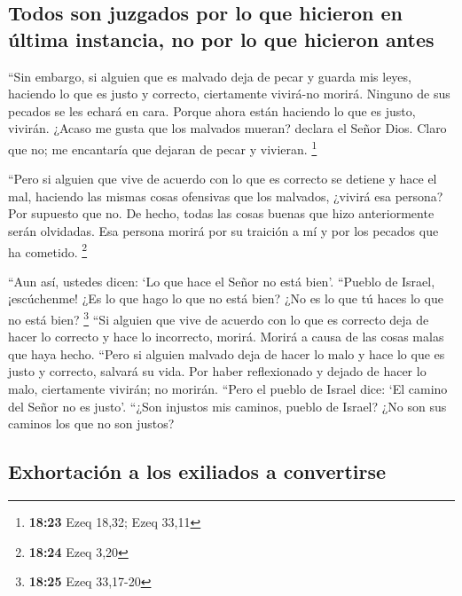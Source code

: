 \hypertarget{todos-son-juzgados-por-lo-que-hicieron-en-uxfaltima-instancia-no-por-lo-que-hicieron-antes}{%
\subsection{Todos son juzgados por lo que hicieron en última instancia,
no por lo que hicieron
antes}\label{todos-son-juzgados-por-lo-que-hicieron-en-uxfaltima-instancia-no-por-lo-que-hicieron-antes}}

 ``Sin embargo, si alguien que es malvado deja de pecar y
guarda mis leyes, haciendo lo que es justo y correcto, ciertamente
vivirá-no morirá.  Ninguno de sus pecados se les echará
en cara. Porque ahora están haciendo lo que es justo, vivirán.
 ¿Acaso me gusta que los malvados mueran? declara el
Señor Dios. Claro que no; me encantaría que dejaran de pecar y vivieran.
\footnote{\textbf{18:23} Ezeq 18,32; Ezeq 33,11}

 ``Pero si alguien que vive de acuerdo con lo que es
correcto se detiene y hace el mal, haciendo las mismas cosas ofensivas
que los malvados, ¿vivirá esa persona? Por supuesto que no. De hecho,
todas las cosas buenas que hizo anteriormente serán olvidadas. Esa
persona morirá por su traición a mí y por los pecados que ha cometido.
\footnote{\textbf{18:24} Ezeq 3,20}

 ``Aun así, ustedes dicen: `Lo que hace el Señor no está
bien'. ``Pueblo de Israel, ¡escúchenme! ¿Es lo que hago lo que no está
bien? ¿No es lo que tú haces lo que no está bien? \footnote{\textbf{18:25}
  Ezeq 33,17-20}  ``Si alguien que vive de acuerdo con lo
que es correcto deja de hacer lo correcto y hace lo incorrecto, morirá.
Morirá a causa de las cosas malas que haya hecho.  ``Pero
si alguien malvado deja de hacer lo malo y hace lo que es justo y
correcto, salvará su vida.  Por haber reflexionado y
dejado de hacer lo malo, ciertamente vivirán; no morirán.
 ``Pero el pueblo de Israel dice: `El camino del Señor no
es justo'. ``¿Son injustos mis caminos, pueblo de Israel? ¿No son sus
caminos los que no son justos?

\hypertarget{exhortaciuxf3n-a-los-exiliados-a-convertirse}{%
\subsection{Exhortación a los exiliados a
convertirse}\label{exhortaciuxf3n-a-los-exiliados-a-convertirse}}

